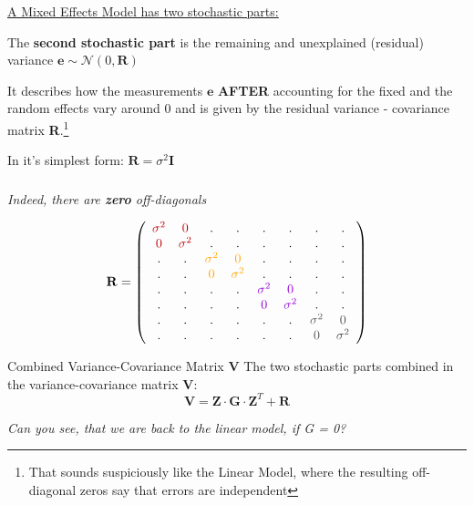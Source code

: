 \documentclass{beamer}
\begin{document}
\begin{frame}{}
\Large
\underline{A Mixed Effects Model has two stochastic parts:}
\vspace{0.2cm}

The \textbf{second stochastic part} is the remaining and unexplained (residual) variance $\mathbf{e} \sim \mathcal{N}(0, \mathbf{R})$

It describes how the measurements $\mathbf{e}$ \textbf{AFTER} accounting for the fixed and the random effects vary around 0 and is given by the residual variance - covariance matrix \textbf{R}.\footnote{That sounds suspiciously like the Linear Model, where the resulting off-diagonal zeros say that errors are independent}
\vspace{0.2cm}

In it's simplest form: $\mathbf{R} = \sigma^2 \mathbf{I}$ 
\end{frame}

\begin{frame}
\frametitle{}
\centering
\Large \textit{Indeed, there are \textbf{zero} off-diagonals}

\[
\mathbf{R} = \left( 
\begin{array}{cccccccc} 
\color{darkred}{\sigma^2} & \color{darkred}{0} & . & . & . & . & . & .\\ 
\color{darkred}{0} & \color{darkred}{\sigma^2} & . & . & . & . & . & .\\ 
. & . & \color{orange}{\sigma^2} & \color{orange}{0} & . & . & . & .\\ 
. & . & \color{orange}{0} & \color{orange}{\sigma^2} & . & . & . & .\\ 
. & . & . & . & \color{violet}{\sigma^2} & \color{violet}{0} & . & .\\ 
. & . & . & . & \color{violet}{0} & \color{violet}{\sigma^2} & . & .\\ 
. & . & . & . & . & . & \color{darkgray}{\sigma^2} & \color{darkgray}{0}\\ 
. & . & . & . & . & . & \color{darkgray}{0} & \color{darkgray}{\sigma^2}
\end{array}\right)
\]
\end{frame}

\begin{frame}{Combined Variance-Covariance Matrix $\mathbf{V}$}
\Large
The two stochastic parts combined in the variance-covariance matrix $\mathbf{V}$:
\[
\mathbf{V} = \mathbf{Z} \cdot \mathbf{G} \cdot \mathbf{Z}^T + \mathbf{R}
\]
\vspace{0.3cm}

\normalsize\textit{Can you see, that we are back to the linear model, if G = 0?}
\end{frame}
\end{document}
